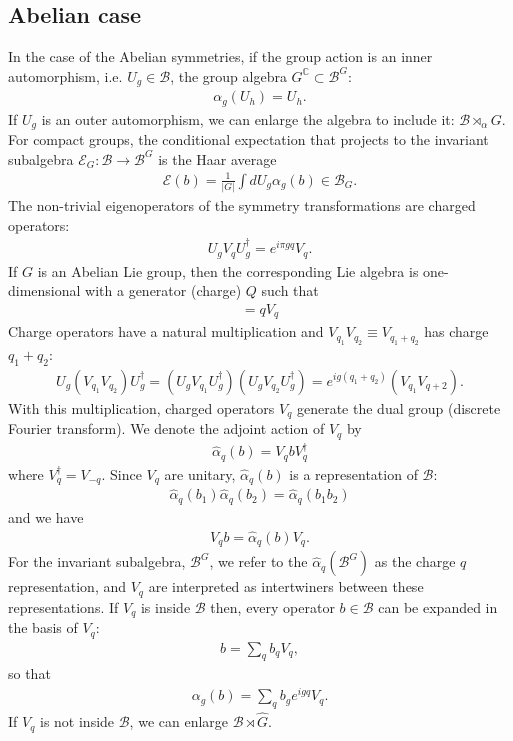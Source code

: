 \documentclass{article}
\theoremstyle{definition}
\begin{document}
\subsection{Abelian case}

In the case of the Abelian symmetries, if the group action is an inner automorphism, i.e. $U_g\in\mathcal{B}$, the group algebra $G^{\mathbb{C}}\subset \mathcal{B}^G$:
 \begin{align}
     \alpha_g(U_h)=U_h.
 \end{align}
If $U_g$ is an outer automorphism, we can enlarge the algebra to include it: $\mathcal{B}\rtimes_\alpha G$.
For compact groups, the conditional expectation that projects to the invariant subalgebra $\mathcal{E}_G:\mathcal{B}\to \mathcal{B}^G$  is the Haar average
 \begin{align}
   \mathcal{E}(b)=\frac{1}{|G|}\int dU_g \alpha_g(b)\in\mathcal{B}_G.
 \end{align}
 The non-trivial eigenoperators of the symmetry transformations are charged operators:
  \begin{align}
    U_{g}V_q U_{g}^{\dagger}=e^{i\pi g q}V_q.
  \end{align}
If $G$ is an Abelian Lie group, then the corresponding Lie algebra is one-dimensional with a generator (charge) $Q$ such that
\begin{align}
    [Q,V_q]=q V_q
\end{align}
Charge operators have a natural multiplication and $V_{q_1}V_{q_2}\equiv V_{q_1+q_2}$ has charge $q_1+q_2$:
\begin{align}
    U_g (V_{q_1} V_{q_2})U_g^\dagger= (U_g V_{q_1} U_g^\dagger)(U_g V_{q_2} U_g^\dagger)=e^{i g (q_1+q_2)}(V_{q_1}V_{q+2}).
\end{align}
With this multiplication, charged operators $V_q$ generate the dual group (discrete Fourier transform). We denote the adjoint action of $V_q$ by 
\begin{align}
    \hat{\alpha}_q(b)=V_q b V_q^\dagger
\end{align}
where $V_q^\dagger=V_{-q}$. 
Since $V_q$ are unitary, $\hat{\alpha}_q(b)$ is a representation of $\mathcal{B}$:
\begin{align}
    \hat{\alpha}_q(b_1)\hat{\alpha}_q(b_2)=\hat{\alpha}_q(b_1b_2)
\end{align}
and we have
\begin{align}
    V_q b =\hat{\alpha}_q(b)V_q.
\end{align}
For the invariant subalgebra, $\mathcal{B}^G$, we refer to the $\hat{\alpha}_q(\mathcal{B}^G)$ as the charge $q$ representation, and $V_q$ are interpreted as intertwiners between these representations. If $V_q$ is inside $\mathcal{B}$ then, every operator $b\in\mathcal{B}$ can be expanded in the basis of $V_q$:
\begin{align}
    b=\sum_q b_q V_q,
\end{align}
so that
\begin{align}
    \alpha_g(b)=\sum_q b_g e^{i g q}V_q.
\end{align}
If $V_q$ is not inside $\mathcal{B}$, we can enlarge $\mathcal{B}\rtimes {\hat{G}}$.
\end{document}
